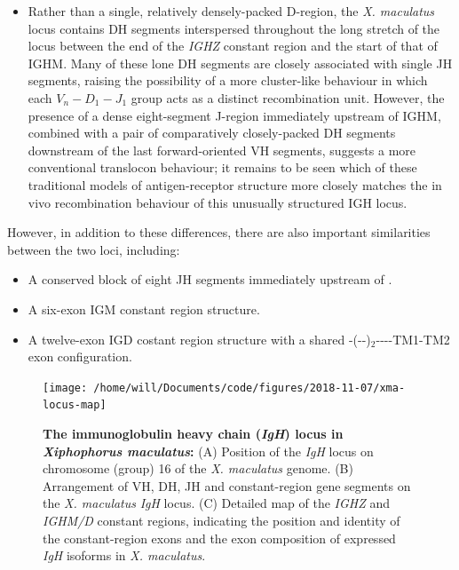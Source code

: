 \begin{itemize}
	\item Rather than a single, relatively densely-packed D-region, the \textit{X. maculatus} locus contains DH segments interspersed throughout the long stretch of the locus between the end of the \textit{IGHZ} constant region and the start of that of IGHM. Many of these lone DH segments are closely associated with single JH segments, raising the possibility of a more cluster-like behaviour in which each $V_n-D_1-J_1$ group acts as a distinct recombination unit. However, the presence of a dense eight-segment J-region immediately upstream of IGHM, combined with a pair of comparatively closely-packed DH segments downstream of the last forward-oriented VH segments, suggests a more conventional translocon behaviour; it remains to be seen which of these traditional models of antigen-receptor structure more closely matches the in vivo recombination behaviour of this unusually structured IGH locus.
	\end{itemize}
	
However, in addition to these differences, there are also important similarities between the two loci, including:

\begin{itemize}
\item A conserved block of eight JH segments immediately upstream of . %
\item A six-exon IGM constant region structure.
\item A twelve-exon IGD costant region structure with a shared -(--)$_2$----TM1-TM2 exon configuration.
\end{itemize}

	
	
		\begin{figure}
		\centering
	\texttt{[image: /home/will/Documents/code/figures/2018-11-07/xma-locus-map]} %
	\caption[The immunoglobulin heavy chain (\textit{IgH}) locus in \textit{}]{\textbf{The immunoglobulin heavy chain (\textit{IgH}) locus in \textit{Xiphophorus maculatus}:} (A) Position of the \textit{IgH} locus on chromosome (group) 16 of the \textit{X. maculatus} genome. (B) Arrangement of VH, DH, JH and constant-region gene segments on the \textit{X. maculatus} \textit{IgH} locus. (C) Detailed map of the \textit{IGHZ} and \textit{IGHM/D} constant regions, indicating the position and identity of the constant-region exons and the exon composition of expressed \textit{IgH} isoforms in \textit{X. maculatus}.}
	\label{fig:nfu-locus-map}
	\end{figure}
	
